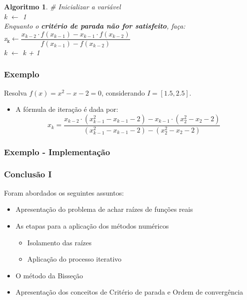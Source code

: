 \documentclass{beamer}
\theoremstyle{mystyle}
\newtheorem{algoritmo}[theorem]{Algoritmo}
\begin{document}
\begin{frame}
	\begin{algoritmo}
		\# Inicializar a variável\\
		k $\leftarrow$ 1 \\
		Enquanto o \textbf{critério de parada não for satisfeito}, faça:\\
		\quad x$ _{\texttt{k}} \leftarrow \dfrac{x_{k - 2} \cdot f(x_{k - 1}) - x_{k - 1} \cdot f(x_{k - 2})}{f(x_{k - 1}) - f(x_{k - 2}) } $ \\
		\quad k $\leftarrow$ k + 1
	\end{algoritmo}
\end{frame}

\begin{frame}
	\frametitle{Exemplo}
	Resolva $ f (x) = x^{2} - x - 2 = 0 $, considerando $ I = [1.5, 2.5] $.
	\pause
	
	\begin{itemize}
		\item A fórmula de iteração é dada por:
		\begin{equation*}
			x_{k} =\frac{x_{k - 2} \cdot (x_{k - 1}^{2} - x_{k - 1} - 2) - x_{k - 1} \cdot (x_{2}^{2} - x_{2} - 2)}{(x_{k - 1}^{2} - x_{k - 1} - 2) - (x_{2}^{2} - x_{2} - 2)}
		\end{equation*}
	\end{itemize}
\end{frame}

\begin{frame}
	\frametitle{Exemplo - Implementação}
	\centering
	\href{https://colab.research.google.com/drive/1vZgdMgXO5qvClp5dK3kR-Qs4BnWPkcu2?usp=sharing}{}
\end{frame}

\begin{frame}
	\frametitle{Conclusão I}	
	Foram abordados os seguintes assuntos:
	\begin{itemize}
		\item Apresentação do problema de achar raízes de funções reais
		\item As etapas para a aplicação dos métodos numéricos
		\begin{itemize}
			\item Isolamento das raízes
			\item Aplicação do processo iterativo
		\end{itemize}
		\item O método da Bisseção
		\item Apresentação dos conceitos de Critério de parada e Ordem de convergência
	\end{itemize}
\end{frame}
\end{document}
